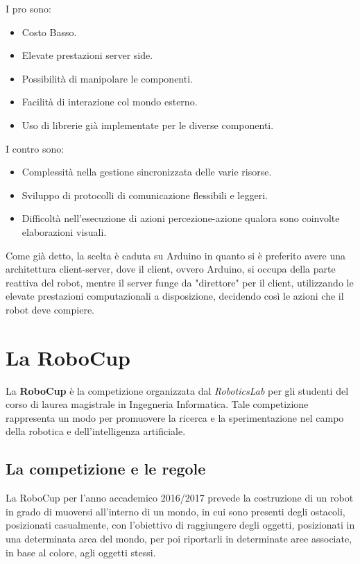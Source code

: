 \documentclass[a4paper,12pt,italian]{article}
\begin{document}
I pro sono:
\begin{itemize}
	\item Costo Basso.
	\item Elevate prestazioni server side. 
	\item Possibilità di manipolare le componenti. 
	\item Facilità di interazione col mondo esterno. 
	\item Uso di librerie già implementate per le diverse componenti. 
\end{itemize}

I contro sono:
\begin{itemize}
	\item Complessità nella gestione sincronizzata delle varie risorse.
	\item Sviluppo di protocolli di comunicazione flessibili e leggeri.
	\item Difficoltà nell’esecuzione di azioni percezione-azione qualora sono coinvolte elaborazioni visuali. 
\end{itemize}

Come già detto, la scelta è caduta su Arduino in quanto si è preferito avere una architettura client-server, dove il client, ovvero Arduino, si occupa della parte reattiva del robot, mentre il server funge da "direttore" per il client, utilizzando le elevate prestazioni computazionali a disposizione, decidendo così le azioni che il robot deve compiere.

\section{La RoboCup}

La \textbf{RoboCup} è la competizione organizzata dal \textit{RoboticsLab} per gli studenti del corso di laurea magistrale in Ingegneria Informatica. Tale competizione rappresenta un modo per promuovere la ricerca e la sperimentazione nel campo della robotica e dell'intelligenza artificiale. 


\subsection{La competizione e le regole}

La RoboCup per l'anno accademico 2016/2017 prevede la costruzione di un robot in grado di muoversi all'interno di un mondo, in cui sono presenti degli ostacoli, posizionati casualmente, con l'obiettivo di raggiungere degli oggetti, posizionati in una determinata area del mondo, per poi riportarli in determinate aree associate, in base al colore, agli oggetti stessi.
\end{document}
